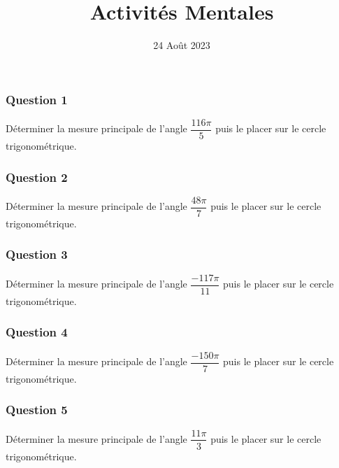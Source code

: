 \documentclass[15pt, mathserif]{beamer}
\title{Activités Mentales}
\date{24 Août 2023}
\begin{document}
\begin{frame}
    \titlepage
\end{frame}

\begin{frame} 
	\frametitle{Question 1}
Déterminer la mesure principale de l'angle $\dfrac{116\pi}{5}$ puis le placer sur le cercle trigonométrique.\end{frame}


\begin{frame} 
	\frametitle{Question 2}
Déterminer la mesure principale de l'angle $\dfrac{48\pi}{7}$ puis le placer sur le cercle trigonométrique.\end{frame}


\begin{frame} 
	\frametitle{Question 3}
Déterminer la mesure principale de l'angle $\dfrac{-117\pi}{11}$ puis le placer sur le cercle trigonométrique.\end{frame}


\begin{frame} 
	\frametitle{Question 4}
Déterminer la mesure principale de l'angle $\dfrac{-150\pi}{7}$ puis le placer sur le cercle trigonométrique.\end{frame}


\begin{frame} 
	\frametitle{Question 5}
Déterminer la mesure principale de l'angle $\dfrac{11\pi}{3}$ puis le placer sur le cercle trigonométrique.\end{frame}
\end{document}
